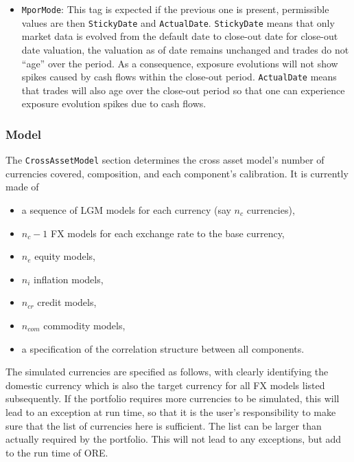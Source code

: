 \documentclass[12pt, a4paper]{article}
\begin{document}
{\begin{itemize}
\item {\tt MporMode}: This tag is expected if the previous one is present, permissible values are then {\tt StickyDate} and {\tt ActualDate}. {\tt StickyDate} means that only market data is evolved from the default date to close-out date for close-out date valuation, the valuation as of date remains unchanged and trades do not ``age'' over the period. As a consequence, exposure evolutions will not show spikes caused by cash flows within the close-out period. {\tt ActualDate} means that trades will also age over the close-out period so that one can experience exposure evolution spikes due to cash flows. 
\end{itemize}

\subsubsection{Model}\label{sec:sim_model}

The {\tt CrossAssetModel} section determines the cross asset model's number of currencies covered, composition, and each
component's calibration. It is currently made of 
\begin{itemize}
\item a sequence of LGM models for each currency (say $n_c$ currencies), 
\item $n_c-1$ FX models for each exchange rate to the base currency, 
\item $n_e$ equity models,
\item $n_i$ inflation models, 
\item $n_{cr}$ credit models, 
\item $n_{com}$ commodity models, 
\item a specification of the correlation structure between all components.
\end{itemize}

\medskip The simulated currencies are specified as follows, with clearly identifying the domestic currency which is also
the target currency for all FX models listed subsequently. If the portfolio requires more currencies to be simulated,
this will lead to an exception at run time, so that it is the user's responsibility to make sure that the list of
currencies here is sufficient. The list can be larger than actually required by the portfolio. This will not lead to any
exceptions, but add to the run time of ORE.

}
\end{document}
